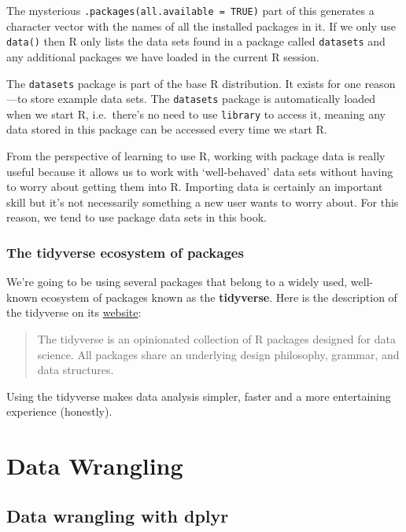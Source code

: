 \documentclass[
]{book}
\begin{document}
The mysterious \texttt{.packages(all.available\ =\ TRUE)} part of this generates a character vector with the names of all the installed packages in it. If we only use \texttt{data()} then R only lists the data sets found in a package called \texttt{datasets} and any additional packages we have loaded in the current R session.

The \texttt{datasets} package is part of the base R distribution. It exists for one reason---to store example data sets. The \texttt{datasets} package is automatically loaded when we start R, i.e.~there's no need to use \texttt{library} to access it, meaning any data stored in this package can be accessed every time we start R.

From the perspective of learning to use R, working with package data is really useful because it allows us to work with `well-behaved' data sets without having to worry about getting them into R. Importing data is certainly an important skill but it's not necessarily something a new user wants to worry about. For this reason, we tend to use package data sets in this book.

\hypertarget{the-tidyverse-ecosystem-of-packages}{%
\section{The tidyverse ecosystem of packages}\label{the-tidyverse-ecosystem-of-packages}}

We're going to be using several packages that belong to a widely used, well-known ecosystem of packages known as the \textbf{tidyverse}. Here is the description of the tidyverse on its \href{https://www.tidyverse.org/}{website}:

\begin{quote}
The tidyverse is an opinionated collection of R packages designed for data science. All packages share an underlying design philosophy, grammar, and data structures.
\end{quote}

Using the tidyverse makes data analysis simpler, faster and a more entertaining experience (honestly).

\hypertarget{part-data-wrangling}{%
\part{Data Wrangling}\label{part-data-wrangling}}

\hypertarget{data-wrangling-with-dplyr}{%
\chapter{\texorpdfstring{Data wrangling with \textbf{dplyr}}{Data wrangling with dplyr}}\label{data-wrangling-with-dplyr}}
\end{document}
